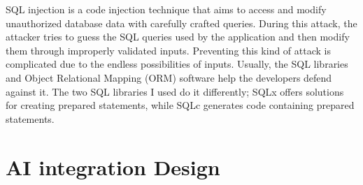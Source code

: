 SQL injection is a code injection technique that aims to access and modify unauthorized database data with carefully crafted queries. During this attack, the attacker tries to guess the SQL queries used by the application and then modify them through improperly validated inputs. Preventing this kind of attack is complicated due to the endless possibilities of inputs. Usually, the SQL libraries and Object Relational Mapping (ORM) software help the developers defend against it. The two SQL libraries I used do it differently; SQLx offers solutions for creating prepared statements, while SQLc generates code containing prepared statements.

\section{AI integration Design}